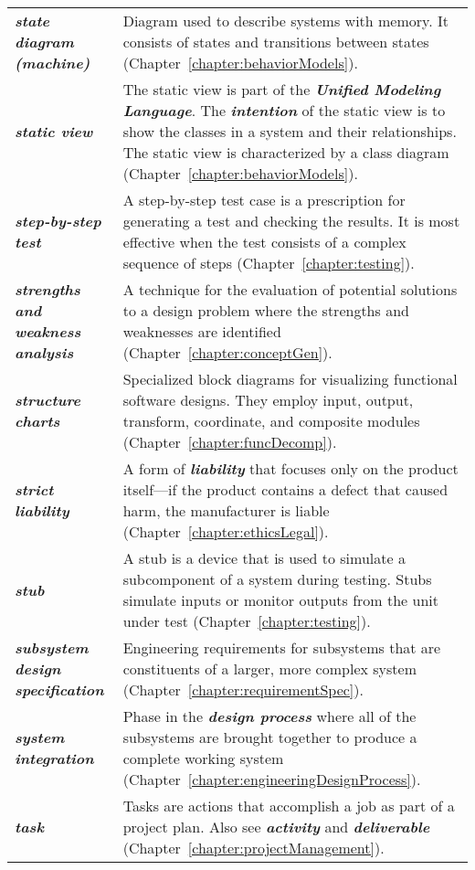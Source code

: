 \begin{longtable} { p{3cm} p{11cm}}
\emph{\textbf{state diagram (machine)}} & Diagram used to describe
systems with memory. It consists of states and transitions between
states (Chapter~\ref{chapter:behaviorModels}). \B \\
\emph{\textbf{static view}} & The static view is part of the
\emph{\textbf{Unified Modeling Language}}. The \emph{\textbf{intention}}
of the static view is to show the classes in a system and their
relationships. The static view is characterized by a class diagram
(Chapter~\ref{chapter:behaviorModels}). \B \\
\emph{\textbf{step-by-step test}} & A step-by-step test case is a
prescription for generating a test and checking the results. It is most
effective when the test consists of a complex sequence of steps 
(Chapter~\ref{chapter:testing}). \B \\
\emph{\textbf{strengths and weakness analysis}} & A technique for the
evaluation of potential solutions to a design problem where the
strengths and weaknesses are identified (Chapter~\ref{chapter:conceptGen}). \B \\
\emph{\textbf{structure charts}} & Specialized block diagrams for
visualizing functional software designs. They employ input, output,
transform, coordinate, and composite modules (Chapter~\ref{chapter:funcDecomp}). \B \\
\emph{\textbf{strict liability}} & A form of \emph{\textbf{liability}}
that focuses only on the product itself---if the product contains a
defect that caused harm, the manufacturer is liable (Chapter~\ref{chapter:ethicsLegal}). \B \\
\emph{\textbf{stub}} & A stub is a device that is used to simulate a
subcomponent of a system during testing. Stubs simulate inputs or
monitor outputs from the unit under test (Chapter~\ref{chapter:testing}). \B \\
\emph{\textbf{subsystem design specification}} & Engineering
requirements for subsystems that are constituents of a larger, more
complex system (Chapter~\ref{chapter:requirementSpec}). \B \\
\emph{\textbf{system integration}} & Phase in the \emph{\textbf{design
process}} where all of the subsystems are brought together to produce a
complete working system (Chapter~\ref{chapter:engineeringDesignProcess}). \B \\
\emph{\textbf{task}} & Tasks are actions that accomplish a job as part
of a project plan. Also see \emph{\textbf{activity}} and
\emph{\textbf{deliverable}} (Chapter~\ref{chapter:projectManagement}). \B \\

\end{longtable}

